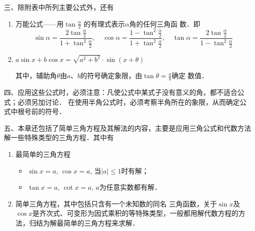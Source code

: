 三、除附表中所列主要公式外，还有
\begin{enumerate}
    \item 万能公式——用$\tan\frac{\alpha}{2}$
的有理式表示$\alpha$角的任何三角函
数．即
\[\sin\alpha=\frac{2\tan\frac{\alpha}{2}}{1+\tan^2\frac{\alpha}{2}},\quad \cos\alpha=\frac{1-\tan^2\frac{\alpha}{2}}{1+\tan^2\frac{\alpha}{2}},\quad \tan\alpha=\frac{2\tan\frac{\alpha}{2}}{1-\tan^2\frac{\alpha}{2}} \]

\item $a\sin x+b\cos x=\sqrt{a^2+b^2}\cdot \sin(x+\theta)$

其中，辅助角$\theta$由$a$、$b$的符号确定象限，由$\tan\theta=\frac{a}{b}$确定
数值．
\end{enumerate}

四、应用这些公式时，必须注意：凡使公式中某式子没有意义的角，都不适合公式；必须另加讨论．
在使用半角公式时，必须考察半角所在的象限，从而确定公式中根号前的符号．

五、本章还包括了简单三角方程及其解法的内容，主要是应用三角公式和代数方法解一些特殊类型的三角方程．其中有
\begin{enumerate}
    \item 最简单的三角方程
    \begin{itemize}
        \item $\sin x=a$, $\cos x=a$, 当$|a|\le 1$时有解；
        \item $\tan x=a$, $\cot x=a$, $a$为任意实数都有解．
    \end{itemize}

\item 简单三角方程，其中包括只含有一个未知数的同名
三角函数，关于$\sin x$及$\cos x$是齐次式、可变形为因式乘积的等特殊类型，一般都用解代数方程的方法，归结为解最简单的三角方程来求解．
\end{enumerate}

